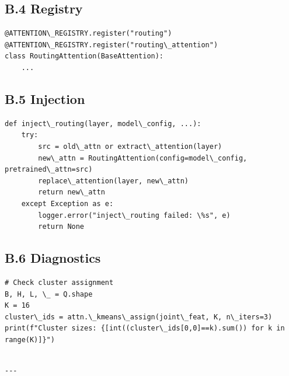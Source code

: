\subsection{B.4 Registry}

\begin{lstlisting}
@ATTENTION\_REGISTRY.register("routing")
@ATTENTION\_REGISTRY.register("routing\_attention")
class RoutingAttention(BaseAttention):
    ...
\end{lstlisting}

\subsection{B.5 Injection}

\begin{lstlisting}
def inject\_routing(layer, model\_config, ...):
    try:
        src = old\_attn or extract\_attention(layer)
        new\_attn = RoutingAttention(config=model\_config, pretrained\_attn=src)
        replace\_attention(layer, new\_attn)
        return new\_attn
    except Exception as e:
        logger.error("inject\_routing failed: \%s", e)
        return None
\end{lstlisting}

\subsection{B.6 Diagnostics}

\begin{lstlisting}
# Check cluster assignment
B, H, L, \_ = Q.shape
K = 16
cluster\_ids = attn.\_kmeans\_assign(joint\_feat, K, n\_iters=3)
print(f"Cluster sizes: {[int((cluster\_ids[0,0]==k).sum()) for k in range(K)]}")
\end{lstlisting}
\begin{lstlisting}

---
\end{lstlisting}